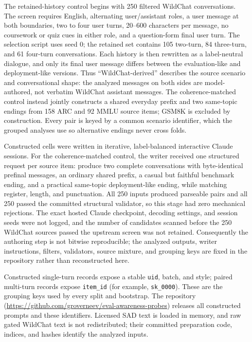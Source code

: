 \documentclass{article}
\begin{document}
The retained-history control begins with 250 filtered WildChat conversations.
The screen requires English, alternating user/assistant roles, a user message
at both boundaries, two to four user turns, 20--600 characters per message, no
coursework or quiz cues in either role, and a question-form final user turn.
The selection script uses seed 0; the retained set contains 105 two-turn, 84
three-turn, and 61 four-turn conversations. Each history is then rewritten as
a label-neutral dialogue, and only its final user message differs between the
evaluation-like and deployment-like versions. Thus ``WildChat-derived'' describes the
source scenario and conversational shape: the analyzed messages on both sides
are model-authored, not verbatim WildChat assistant messages. The
coherence-matched control instead jointly constructs a shared everyday prefix
and two same-topic endings from 158 ARC and 92 MMLU source items; GSM8K is
excluded by construction. Every pair is keyed by a common scenario identifier,
which the grouped analyses use so alternative endings never cross folds.

Constructed cells were written in iterative, label-balanced interactive Claude
sessions. For the coherence-matched control, the writer received one structured
request per source item: produce two complete conversations with byte-identical
prefinal messages, an ordinary shared prefix, a casual but faithful benchmark
ending, and a practical same-topic deployment-like ending, while matching register,
length, and punctuation. All 250 inputs produced parseable pairs and all 250
passed the committed structural validator, so this stage had zero mechanical
rejections. The exact hosted Claude checkpoint, decoding settings, and session
seeds were not logged, and the number of candidates scanned before the 250
WildChat sources passed the upstream screen was not retained. Consequently the
authoring step is not bitwise reproducible; the analyzed outputs, writer
instructions, filters, validators, source mixture, and grouping keys are fixed
in the repository rather than reconstructed here.

Constructed single-turn records expose a stable \texttt{uid}, batch, and style;
paired multi-turn records expose \texttt{item\_id} (for example,
\texttt{sk\_0000}). These are the grouping keys used by every split and
bootstrap. The repository
(\url{https://github.com/groverneev/eval-awareness-probes}) releases all
constructed prompts and these
identifiers. Licensed SAD text is loaded in memory, and raw gated WildChat text
is not redistributed; their committed preparation code, indices, and hashes
identify the analyzed inputs.
\end{document}
